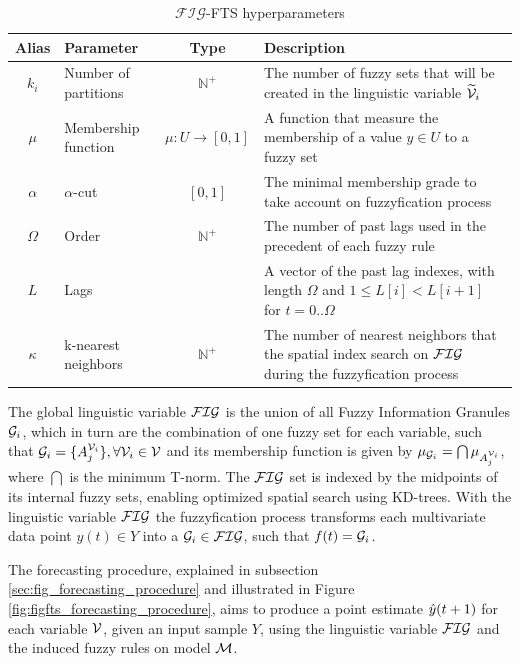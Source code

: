 \begin{table}[]
    \centering
    \begin{tabular}{|c|m{2cm}|c|m{}|} \hline
        \textbf{Alias} & \textbf{Parameter} & \textbf{Type} & \textbf{Description}  \\ \hline
         $k_i$ & Number of partitions & $\mathbb{N}^+$ & The number of fuzzy sets that will be created in the linguistic variable $\widetilde{\mathcal{V}}_i$  \\ \hline
         $\mu$ & Membership function & $\mu: U \rightarrow [0,1] $ & A function that measure the membership of a value $y \in U$ to a fuzzy set  \\\hline
         $\alpha$ & $\alpha$-cut & $[0,1]$ & The minimal membership grade to take account on fuzzyfication process \\ \hline
         $\Omega$ & Order & $\mathbb{N}^+$ & The number of past lags used in the precedent of each fuzzy rule \\\hline
         $L$ & Lags & & A vector of the past lag indexes, with length $\Omega$ and $1 \leq L[i] < L[i+1]$ for  $t=0..\Omega$ \\ \hline
         $\kappa$ & k-nearest neighbors & $\mathbb{N}^+$ & The number of nearest neighbors that the spatial index search on $\mathcal{FIG}$ during the fuzzyfication process \\ \hline
    \end{tabular}
    \caption{$\mathcal{FIG}$-FTS hyperparameters}
    \label{tab:fig_hyperparameters}
\end{table}

The global linguistic variable $\mathcal{FIG}$ is the union of all Fuzzy Information Granules $\mathcal{G}_i$, which in turn are the combination of one fuzzy set for each variable, such that $\mathcal{G}_i = \{ A_j^{\mathcal{V}_i} \}, \forall \mathcal{V}_i \in \mathcal{V}$ and its membership function is given by $\mu_{\mathcal{G}_i} = \bigcap \mu_{A_j^{\mathcal{V}_i}}$, where $\bigcap$ is the minimum T-norm. The $\mathcal{FIG}$ set is indexed by the midpoints of its internal fuzzy sets, enabling optimized spatial search using KD-trees.  
With the linguistic variable $\mathcal{FIG}$ the fuzzyfication process transforms each multivariate data point $y(t) \in Y$ into a  $\mathcal{G}_i \in \mathcal{FIG}$, such that $f(t) = \mathcal{G}_i$.

The forecasting procedure, explained in subsection \ref{sec:fig_forecasting_procedure} and illustrated in Figure \ref{fig:figfts_forecasting_procedure}, aims to produce a point estimate $\hat{y}(t+1)$ for each variable $\mathcal{V}$, given an input sample $Y$, using the linguistic variable $\mathcal{FIG}$ and the induced fuzzy rules on model $\mathcal{M}$.

